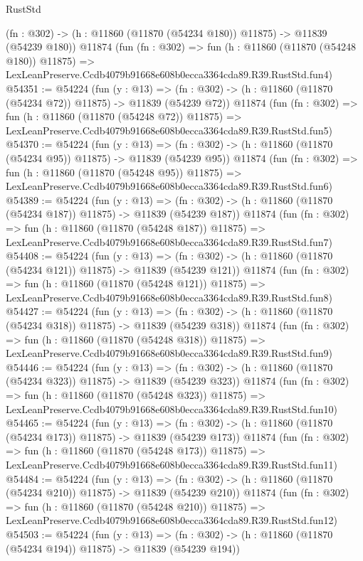 \begin{lexlean}{RustStd}
\begin{coremodule}
    (fn : @302) -> (h : @11860 (@11870 (@54234 @180)) @11875) -> @11839 (@54239 @180))
    @11874
    (fun (fn : @302) =>
    fun (h : @11860 (@11870 (@54248 @180)) @11875) =>
    LexLeanPreserve.Ccdb4079b91668e608b0ecca3364cda89.R39.RustStd.fun4)
@54351 := @54224
    (fun (y : @13) =>
    (fn : @302) -> (h : @11860 (@11870 (@54234 @72)) @11875) -> @11839 (@54239 @72))
    @11874
    (fun (fn : @302) =>
    fun (h : @11860 (@11870 (@54248 @72)) @11875) =>
    LexLeanPreserve.Ccdb4079b91668e608b0ecca3364cda89.R39.RustStd.fun5)
@54370 := @54224
    (fun (y : @13) =>
    (fn : @302) -> (h : @11860 (@11870 (@54234 @95)) @11875) -> @11839 (@54239 @95))
    @11874
    (fun (fn : @302) =>
    fun (h : @11860 (@11870 (@54248 @95)) @11875) =>
    LexLeanPreserve.Ccdb4079b91668e608b0ecca3364cda89.R39.RustStd.fun6)
@54389 := @54224
    (fun (y : @13) =>
    (fn : @302) -> (h : @11860 (@11870 (@54234 @187)) @11875) -> @11839 (@54239 @187))
    @11874
    (fun (fn : @302) =>
    fun (h : @11860 (@11870 (@54248 @187)) @11875) =>
    LexLeanPreserve.Ccdb4079b91668e608b0ecca3364cda89.R39.RustStd.fun7)
@54408 := @54224
    (fun (y : @13) =>
    (fn : @302) -> (h : @11860 (@11870 (@54234 @121)) @11875) -> @11839 (@54239 @121))
    @11874
    (fun (fn : @302) =>
    fun (h : @11860 (@11870 (@54248 @121)) @11875) =>
    LexLeanPreserve.Ccdb4079b91668e608b0ecca3364cda89.R39.RustStd.fun8)
@54427 := @54224
    (fun (y : @13) =>
    (fn : @302) -> (h : @11860 (@11870 (@54234 @318)) @11875) -> @11839 (@54239 @318))
    @11874
    (fun (fn : @302) =>
    fun (h : @11860 (@11870 (@54248 @318)) @11875) =>
    LexLeanPreserve.Ccdb4079b91668e608b0ecca3364cda89.R39.RustStd.fun9)
@54446 := @54224
    (fun (y : @13) =>
    (fn : @302) -> (h : @11860 (@11870 (@54234 @323)) @11875) -> @11839 (@54239 @323))
    @11874
    (fun (fn : @302) =>
    fun (h : @11860 (@11870 (@54248 @323)) @11875) =>
    LexLeanPreserve.Ccdb4079b91668e608b0ecca3364cda89.R39.RustStd.fun10)
@54465 := @54224
    (fun (y : @13) =>
    (fn : @302) -> (h : @11860 (@11870 (@54234 @173)) @11875) -> @11839 (@54239 @173))
    @11874
    (fun (fn : @302) =>
    fun (h : @11860 (@11870 (@54248 @173)) @11875) =>
    LexLeanPreserve.Ccdb4079b91668e608b0ecca3364cda89.R39.RustStd.fun11)
@54484 := @54224
    (fun (y : @13) =>
    (fn : @302) -> (h : @11860 (@11870 (@54234 @210)) @11875) -> @11839 (@54239 @210))
    @11874
    (fun (fn : @302) =>
    fun (h : @11860 (@11870 (@54248 @210)) @11875) =>
    LexLeanPreserve.Ccdb4079b91668e608b0ecca3364cda89.R39.RustStd.fun12)
@54503 := @54224
    (fun (y : @13) =>
    (fn : @302) -> (h : @11860 (@11870 (@54234 @194)) @11875) -> @11839 (@54239 @194))

\end{coremodule}
\end{lexlean}
